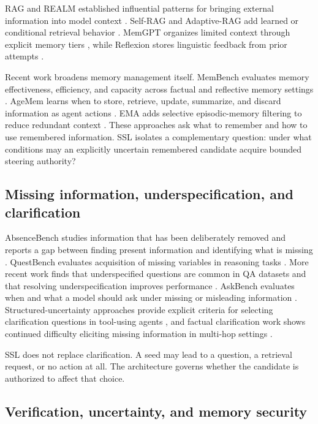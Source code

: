 \documentclass[11pt]{article}
\begin{document}
RAG and REALM established influential patterns for bringing external information into model context \citep{lewis2020rag,guu2020realm}. Self-RAG and Adaptive-RAG add learned or conditional retrieval behavior \citep{asai2024selfrag,jeong2024adaptiverag}. MemGPT organizes limited context through explicit memory tiers \citep{packer2023memgpt}, while Reflexion stores linguistic feedback from prior attempts \citep{shinn2023reflexion}.

Recent work broadens memory management itself. MemBench evaluates memory effectiveness, efficiency, and capacity across factual and reflective memory settings \citep{tan2025membench}. AgeMem learns when to store, retrieve, update, summarize, and discard information as agent actions \citep{yu2026agentic}. EMA adds selective episodic-memory filtering to reduce redundant context \citep{lan2026ema}. These approaches ask what to remember and how to use remembered information. SSL isolates a complementary question: under what conditions may an explicitly uncertain remembered candidate acquire bounded steering authority?

\subsection{Missing information, underspecification, and clarification}

AbsenceBench studies information that has been deliberately removed and reports a gap between finding present information and identifying what is missing \citep{fu2025absencebench}. QuestBench evaluates acquisition of missing variables in reasoning tasks \citep{li2025questbench}. More recent work finds that underspecified questions are common in QA datasets and that resolving underspecification improves performance \citep{huang2026underspecified}. AskBench evaluates when and what a model should ask under missing or misleading information \citep{zhao2026askbench}. Structured-uncertainty approaches provide explicit criteria for selecting clarification questions in tool-using agents \citep{suri2026structured}, and factual clarification work shows continued difficulty eliciting missing information in multi-hop settings \citep{toles2025clarification}.

SSL does not replace clarification. A seed may lead to a question, a retrieval request, or no action at all. The architecture governs whether the candidate is authorized to affect that choice.

\subsection{Verification, uncertainty, and memory security}
\end{document}
